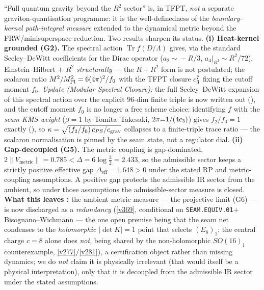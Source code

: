 \begin{keybox}
``Full quantum gravity beyond the $R^2$ sector'' is, in TFPT, \emph{not} a separate graviton-quantisation
programme: it is the well-definedness of the \emph{boundary-kernel path-integral measure} extended to the
dynamical metric beyond the FRW/minisuperspace reduction. Two results sharpen its status.
\textbf{(i) Heat-kernel grounded (G2).} The spectral action $\operatorname{Tr}f(D/\Lambda)$ gives, via the
standard Seeley--DeWitt coefficients for the Dirac operator ($a_2\!\sim\!-R/3$, $a_4|_{R^2}\!\sim\!R^2/72$),
Einstein--Hilbert $+$ $R^2$ \emph{structurally} --- the $R+R^2$ form is not postulated; the scalaron ratio
$M^2/M_{\mathrm{Pl}}^2=6(4\pi)^2/f_0$ with the TFPT closure $c_3^7$ fixing the cutoff moment $f_0$.
\emph{Update (Modular Spectral Closure):} the full Seeley--DeWitt expansion of this spectral action over the
explicit $96$-dim finite triple is now written out (), and the
cutoff moment $f_0$ is no longer a free scheme choice: identifying $f$ with the \emph{seam KMS weight}
($\beta{=}1$ by Tomita--Takesaki, $2\pi{=}1/(4c_3)$) gives $f_2/f_0=1$ exactly
(), so $\kappa=\sqrt{(f_2/f_0)\,c_{PS}/c_{\rm grav}}$ collapses to a
finite-triple trace ratio --- the scalaron normalisation is pinned by the seam state, not a regulator dial.
\textbf{(ii) Gap-decoupled (G5).} The metric coupling is gap-dominated,
$2\|V_{\mathrm{metric}}\|=0.785<\Delta=6\log\tfrac32=2.433$, so the admissible sector keeps a strictly
positive effective gap $\Delta_{\mathrm{eff}}=1.648>0$ under the stated RP and metric-coupling assumptions.
A positive gap protects the admissible IR sector from the ambient, so under those assumptions the
admissible-sector measure is closed. \textbf{What this leaves \mC:} the ambient metric measure --- the
projective limit (G6) --- is now discharged as a \emph{redundancy} (\vref{v369}, conditional on
\texttt{SEAM.EQUIV.01}${+}$Bisognano--Wichmann --- the one open premise being that the seam net condenses to
the \emph{holomorphic} $|\det K|{=}1$ point that selects $(E_8)_1$; the central charge $c{=}8$ alone does
\emph{not}, being shared by the non-holomorphic $SO(16)_1$ counterexample, \vref{v277}/\vref{v281}), a
certification object rather than missing dynamics; we do
\emph{not} claim it is physically irrelevant (that would itself be a physical interpretation), only that it is
decoupled from the admissible IR sector under the stated assumptions. 

\end{keybox}
